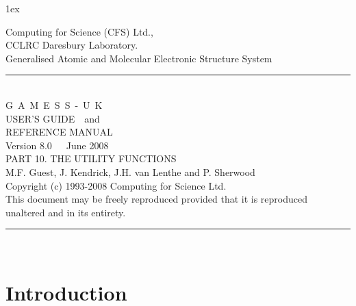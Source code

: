 \documentclass[11pt,fleqn]{article}
\begin{document}
\sf
\parindent 0cm
\parskip 1ex
\begin{flushleft}
 
Computing for Science (CFS) Ltd.,\\CCLRC Daresbury Laboratory.\\[0.30in]
{\large Generalised Atomic and Molecular Electronic Structure System }\\[.2in]
\rule{150mm}{3mm}\\
\vspace{.2in}
{\huge G~A~M~E~S~S~-~U~K}\\[.3in]
{\huge USER'S GUIDE~~and}\\[.2in]
{\huge REFERENCE MANUAL}\\[0.2in]
{\huge Version 8.0~~~June 2008}\\ [.2in]
{\large PART 10. THE UTILITY FUNCTIONS}\\
\vspace{.1in}
{\large M.F. Guest, J. Kendrick, J.H. van Lenthe and P. Sherwood}\\[0.2in]
 
Copyright (c) 1993-2008 Computing for Science Ltd.\\[.1in]
This document may be freely reproduced provided that it is reproduced\\
unaltered and in its entirety.\\
\vspace{.2in}
\rule{150mm}{3mm}\\
\end{flushleft}

\tableofcontents
\newpage
% 


\section[Introduction]{Introduction}
\end{document}
